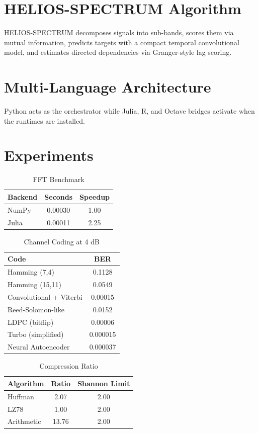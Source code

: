 \documentclass[10pt,conference]{IEEEtran}
\begin{document}
\section{HELIOS-SPECTRUM Algorithm}
HELIOS-SPECTRUM decomposes signals into sub-bands, scores them via mutual information, predicts targets with a compact temporal convolutional model, and estimates directed dependencies via Granger-style lag scoring.

\section{Multi-Language Architecture}
Python acts as the orchestrator while Julia, R, and Octave bridges activate when the runtimes are installed.

\section{Experiments}
\begin{table}[h]
\centering
\caption{FFT Benchmark}
\begin{tabular}{lcc}
\toprule
Backend & Seconds & Speedup \\
\midrule
NumPy & 0.00030 & 1.00 \\
Julia & 0.00011 & 2.25 \\
\bottomrule
\end{tabular}
\end{table}
\begin{table}[h]
\centering
\caption{Channel Coding at 4 dB}
\begin{tabular}{lc}
\toprule
Code & BER \\
\midrule
Hamming (7,4) & 0.1128 \\
Hamming (15,11) & 0.0549 \\
Convolutional + Viterbi & 0.00015 \\
Reed-Solomon-like & 0.0152 \\
LDPC (bitflip) & 0.00006 \\
Turbo (simplified) & 0.000015 \\
Neural Autoencoder & 0.000037 \\
\bottomrule
\end{tabular}
\end{table}
\begin{table}[h]
\centering
\caption{Compression Ratio}
\begin{tabular}{lcc}
\toprule
Algorithm & Ratio & Shannon Limit \\
\midrule
Huffman & 2.07 & 2.00 \\
LZ78 & 1.00 & 2.00 \\
Arithmetic & 13.76 & 2.00 \\
\bottomrule
\end{tabular}
\end{table}
\end{document}
